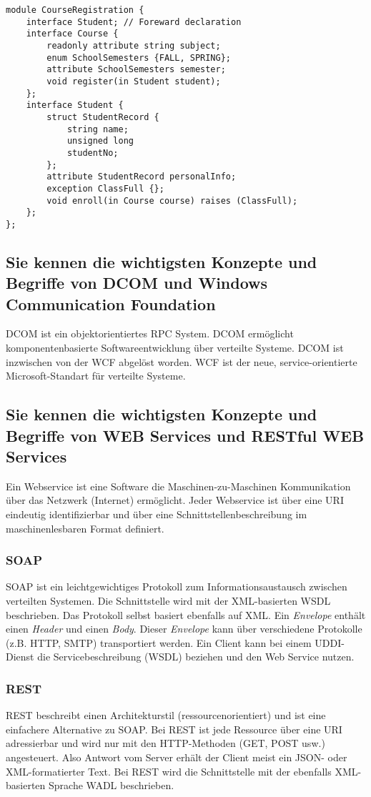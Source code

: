 \begin{lstlisting}[language=IDL, caption={Interface Definition Language (IDL) Beispiel}, label=lst:idl]
module CourseRegistration { 
	interface Student; // Foreward declaration 
	interface Course { 
		readonly attribute string subject; 
		enum SchoolSemesters {FALL, SPRING}; 
		attribute SchoolSemesters semester; 
		void register(in Student student); 
	}; 
	interface Student {
		struct StudentRecord { 
			string name; 
			unsigned long 
			studentNo; 
		}; 
		attribute StudentRecord personalInfo; 
		exception ClassFull {}; 
		void enroll(in Course course) raises (ClassFull); 
	}; 
};
\end{lstlisting}

\subsection{Sie kennen die wichtigsten Konzepte und Begriffe von DCOM und Windows Communication Foundation}

\ac{DCOM} ist ein objektorientiertes RPC System. DCOM ermöglicht komponentenbasierte Softwareentwicklung über verteilte Systeme. \ac{DCOM} ist inzwischen von der \ac{WCF} abgelöst worden. \ac{WCF} ist der neue, service-orientierte Microsoft-Standart für verteilte Systeme. 

\subsection{Sie kennen die wichtigsten Konzepte und Begriffe von WEB Services und RESTful WEB Services}

Ein Webservice ist eine Software die Maschinen-zu-Maschinen Kommunikation über das Netzwerk (Internet) ermöglicht. Jeder Webservice ist über eine \ac{URI} eindeutig identifizierbar und über eine Schnittstellenbeschreibung im maschinenlesbaren Format definiert.

\subsubsection{SOAP}

SOAP ist ein leichtgewichtiges Protokoll zum Informationsaustausch zwischen verteilten Systemen. Die Schnittstelle wird mit der XML-basierten \ac{WSDL} beschrieben. Das Protokoll selbst basiert ebenfalls auf XML. Ein \emph{Envelope} enthält einen \emph{Header} und einen \emph{Body}. Dieser \emph{Envelope} kann über verschiedene Protokolle (z.B. HTTP, SMTP) transportiert werden. Ein Client kann bei einem \acs{UDDI}-Dienst die Servicebeschreibung (\ac{WSDL}) beziehen und den Web Service nutzen.

\subsubsection{REST}

REST beschreibt einen Architekturstil (ressourcenorientiert) und ist eine einfachere Alternative zu SOAP. Bei REST ist jede Ressource über eine \ac{URI} adressierbar und wird nur mit den HTTP-Methoden (GET, POST usw.) angesteuert. Also Antwort vom Server erhält der Client meist ein JSON- oder XML-formatierter Text. Bei REST wird die Schnittstelle mit der ebenfalls XML-basierten Sprache \ac{WADL} beschrieben.